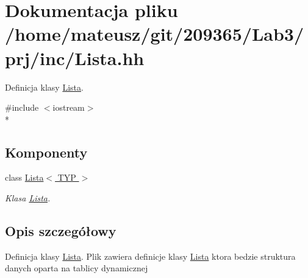 \hypertarget{_lista_8hh}{\section{Dokumentacja pliku /home/mateusz/git/209365/\-Lab3/prj/inc/\-Lista.hh}
\label{_lista_8hh}
}


Definicja klasy \hyperlink{class_lista}{Lista}.  


{\ttfamily \#include $<$iostream$>$}\\*
\subsection*{Komponenty}
\begin{DoxyCompactItemize}
\item 
class \hyperlink{class_lista}{Lista$<$ T\-Y\-P $>$}
\begin{DoxyCompactList}\small\item\em Klasa \hyperlink{class_lista}{Lista}. \end{DoxyCompactList}\end{DoxyCompactItemize}


\subsection{Opis szczegółowy}
Definicja klasy \hyperlink{class_lista}{Lista}. Plik zawiera definicje klasy \hyperlink{class_lista}{Lista} ktora bedzie struktura danych oparta na tablicy dynamicznej 